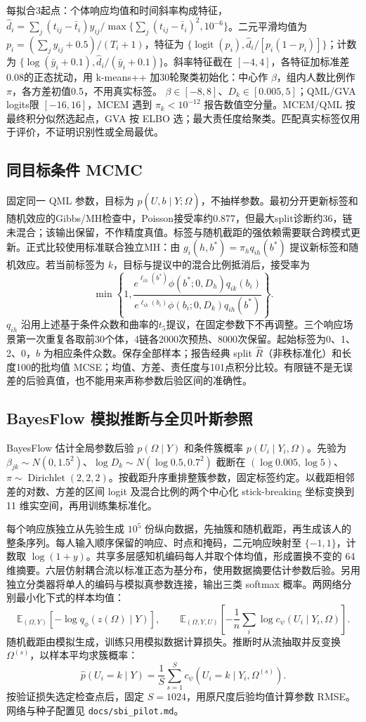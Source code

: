 \documentclass[UTF8,a4paper,11pt,fontset=fandol]{ctexart}
\newcommand{\E}{\mathbb E}\newcommand{\N}{\mathcal N}\newcommand{\KL}{\operatorname{KL}}
\begin{document}
每拟合3起点：个体响应均值和时间斜率构成特征，$\widehat d_i=\sum_j(t_{ij}-\bar t_i)y_{ij}/\max\{\sum_j(t_{ij}-\bar t_i)^2,10^{-6}\}$。二元平滑均值为 $p_i=(\sum_jy_{ij}+0.5)/(T_i+1)$，特征为 $\{\operatorname{logit}(p_i),\widehat d_i/[p_i(1-p_i)]\}$；计数为 $\{\log(\bar y_i+0.1),\widehat d_i/(\bar y_i+0.1)\}$。斜率特征截在 $[-4,4]$，各特征加标准差0.08的正态扰动，用 k-means++ 加30轮聚类初始化：中心作 $\beta$，组内人数比例作 $\pi$，各方差初值0.5，不用真实标签。
$\beta\in[-8,8]$、$D_k\in[0.005,5]$；QML/GVA logits限 $[-16,16]$，MCEM 遇到 $\pi_k<10^{-12}$ 报告数值空分量。MCEM/QML 按最终积分似然选起点，GVA 按 ELBO 选；最大责任度给聚类。匹配真实标签仅用于评价，不证明识别性或全局最优。

\subsection{同目标条件 MCMC}
固定同一 QML 参数，目标为 $p(U,b\mid Y;\widehat\Omega)$，不抽样参数。最初分开更新标签和随机效应的Gibbs/MH检查中，Poisson接受率约0.877，但最大split诊断约36，链未混合；该输出保留，不作精度真值。标签与随机截距的强依赖需要联合跨模式更新。正式比较使用标准联合独立MH：由 $g_i(h,b^*)=\pi_h q_{ih}(b^*)$ 提议新标签和随机效应。若当前标签为 $k$，目标与提议中的混合比例抵消后，接受率为
\[
\min\left\{1,\frac{e^{\ell_{ih}(b^*)}\phi(b^*;0,D_h)q_{ik}(b_i)}{e^{\ell_{ik}(b_i)}\phi(b_i;0,D_k)q_{ih}(b^*)}\right\}.
\]
$q_{ih}$ 沿用上述基于条件众数和曲率的$t_5$提议，在固定参数下不再调整。三个响应场景第一次重复各取前30个体，4链各2000次预热、8000次保留。起始标签为0、1、2、0，$b$ 为相应条件众数。保存全部样本；报告经典 split $\widehat R$（非秩标准化）和长度100的批均值 MCSE；均值、方差、责任度与101点积分比较。有限链不是无误差的后验真值，也不能用来声称参数后验区间的准确性。

\subsection{BayesFlow 模拟推断与全贝叶斯参照}
BayesFlow 估计全局参数后验 $p(\Omega\mid Y)$ 和条件簇概率 $p(U_i\mid Y_i,\Omega)$。先验为 $\beta_{jk}\sim N(0,1.5^2)$、$\log D_k\sim N(\log 0.5,0.7^2)$ 截断在 $(\log 0.005,\log 5)$、$\pi\sim\operatorname{Dirichlet}(2,2,2)$。按截距升序重排整簇参数，固定标签约定。以截距相邻差的对数、方差的区间 logit 及混合比例的两个中心化 stick-breaking 坐标变换到 11 维实空间，再用训练集标准化。

每个响应族独立从先验生成 $10^5$ 份纵向数据，先抽簇和随机截距，再生成该人的整条序列。每人输入顺序保留的响应、时点和掩码，二元响应映射至 $\{-1,1\}$，计数取 $\log(1+y)$。共享多层感知机编码每人并取个体均值，形成置换不变的 64 维摘要。六层仿射耦合流以标准正态为基分布，使用数据摘要估计参数后验。另用独立分类器将单人的编码与模拟真参数连接，输出三类 softmax 概率。两网络分别最小化下式的样本均值：
\[
\E_{(\Omega,Y)}[-\log q_\phi(z(\Omega)\mid Y)],\qquad
\E_{(\Omega,Y,U)}\!\left[-\frac1n\sum_i\log c_\psi(U_i\mid Y_i,\Omega)\right].
\]
随机截距由模拟生成，训练只用模拟数据计算损失。推断时从流抽取并反变换 $\Omega^{(s)}$，以样本平均求簇概率：
\[
\widehat p(U_i=k\mid Y)=\frac{1}{S}\sum_{s=1}^{S}c_\psi(U_i=k\mid Y_i,\Omega^{(s)}).
\]
按验证损失选定检查点后，固定 $S=1024$，用原尺度后验均值计算参数 RMSE。网络与种子配置见 \texttt{docs/sbi\_pilot.md}。
\end{document}
